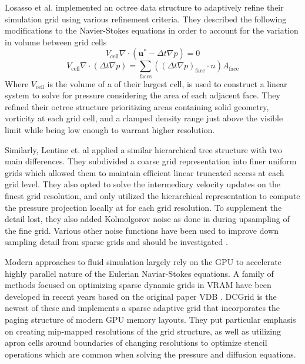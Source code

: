 \documentclass[a4paper, 11pt, titlepage]{article}
\begin{document}
Losasso et al. \cite{losasso2004simulating} implemented an octree data structure to adaptively
refine their simulation grid using various refinement criteria. They described
the following modifications to the Navier-Stokes equations in order to account
for the variation in volume between grid cells
\begin{equation}
    V_\text{cell} \nabla \cdot (\bm{u}^* - \Delta t\nabla p) = 0
\end{equation}
\begin{equation}
    V_\text{cell} \nabla \cdot (\Delta t\nabla p) = \sum_{\text{faces}}((\Delta t \nabla p)_\text{face} \cdot n)A_\text{face}
\end{equation}
Where $V_\text{cell}$ is the volume of a of their largest cell, is used to
construct a linear system to solve for pressure considering the area of each
adjacent face. They refined their octree structure prioritizing areas containing
solid geometry, vorticity at each grid cell, and a clamped density range just
above the visible limit while being low enough to warrant higher resolution.

Similarly, Lentine et. al \cite{lentine2010novel} applied a similar hierarchical tree
structure with two main differences. They subdivided a coarse grid
representation into finer uniform grids which allowed them to maintain efficient
linear truncated access at each grid level. They also opted to solve the
intermediary velocity updates on the finest grid resolution, and only utilized
the hierarchical representation to compute the pressure projection locally at
for each grid resolution. To supplement the detail lost, they also added
Kolmolgorov noise as done in \cite{rasmussen2003smoke} during upsampling of the
fine grid. Various other noise functions have been used to improve down sampling
detail from sparse grids and should be investigated \cite{kim2008wavelet,
bridson2007curl}.

Modern approaches to fluid simulation largely rely on the GPU to accelerate
highly parallel nature of the Eulerian Naviar-Stokes equations. A family of
methods focused on optimizing sparse dynamic grids in VRAM have been developed
in recent years based on the original paper VDB \cite{museth2013vdb}. DCGrid \cite{raateland2022dcgrid} is the
newest of these and implements a sparse adaptive grid that incorporates the
paging structure of modern GPU memory layouts. They put particular emphasis on
creating mip-mapped resolutions of the grid structure, as well as utilizing
apron cells around boundaries of changing resolutions to optimize stencil
operations which are common when solving the pressure and diffusion equations.
\end{document}
